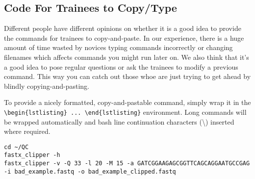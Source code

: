 \subsection{Code For Trainees to Copy/Type}

Different people have different opinions on whether it is a good idea to provide the commands for
trainees to copy-and-paste. In our experience, there is a huge amount of time wasted by novices
typing commands incorrectly or changing filenames which affects commands you might run later on. We
also think that it's a good idea to pose regular questions or ask the trainees to modify a previous
command. This way you can catch out those whoe are just trying to get ahead by blindly
copying-and-pasting.

To provide a nicely formatted, copy-and-pastable command, simply wrap it in the
\verb+\begin{lstlisting} ... \end{lstlisting}+ environment. Long commands will be wrapped
automatically and bash line continuation characters (\textbackslash) inserted where required.

\begin{steps}
\begin{lstlisting}
cd ~/QC
fastx_clipper -h
fastx_clipper -v -Q 33 -l 20 -M 15 -a GATCGGAAGAGCGGTTCAGCAGGAATGCCGAG -i bad_example.fastq -o bad_example_clipped.fastq
\end{lstlisting}
\end{steps}


